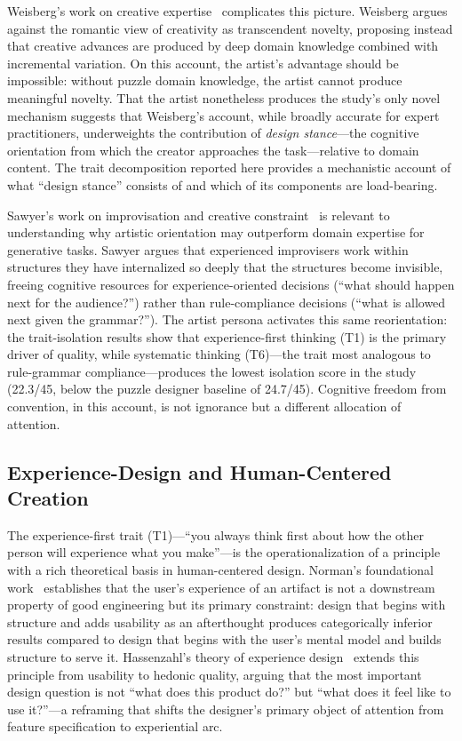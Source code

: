 Weisberg's work on creative expertise~\cite{weisberg2006creativity} complicates this picture. Weisberg argues against the romantic view of creativity as transcendent novelty, proposing instead that creative advances are produced by deep domain knowledge combined with incremental variation. On this account, the artist's advantage should be impossible: without puzzle domain knowledge, the artist cannot produce meaningful novelty. That the artist nonetheless produces the study's only novel mechanism suggests that Weisberg's account, while broadly accurate for expert practitioners, underweights the contribution of \emph{design stance}---the cognitive orientation from which the creator approaches the task---relative to domain content. The trait decomposition reported here provides a mechanistic account of what ``design stance'' consists of and which of its components are load-bearing.

Sawyer's work on improvisation and creative constraint~\cite{sawyer2003improvisation} is relevant to understanding why artistic orientation may outperform domain expertise for generative tasks. Sawyer argues that experienced improvisers work within structures they have internalized so deeply that the structures become invisible, freeing cognitive resources for experience-oriented decisions (``what should happen next for the audience?'') rather than rule-compliance decisions (``what is allowed next given the grammar?''). The artist persona activates this same reorientation: the trait-isolation results show that experience-first thinking (T1) is the primary driver of quality, while systematic thinking (T6)---the trait most analogous to rule-grammar compliance---produces the lowest isolation score in the study (22.3/45, below the puzzle designer baseline of 24.7/45). Cognitive freedom from convention, in this account, is not ignorance but a different allocation of attention.

\subsection{Experience-Design and Human-Centered Creation}

The experience-first trait (T1)---``you always think first about how the other person will experience what you make''---is the operationalization of a principle with a rich theoretical basis in human-centered design. Norman's foundational work~\cite{norman2013design} establishes that the user's experience of an artifact is not a downstream property of good engineering but its primary constraint: design that begins with structure and adds usability as an afterthought produces categorically inferior results compared to design that begins with the user's mental model and builds structure to serve it. Hassenzahl's theory of experience design~\cite{hassenzahl2010experience} extends this principle from usability to hedonic quality, arguing that the most important design question is not ``what does this product do?'' but ``what does it feel like to use it?''---a reframing that shifts the designer's primary object of attention from feature specification to experiential arc.

